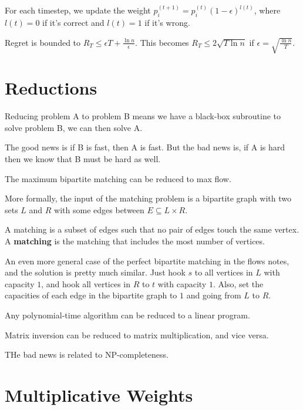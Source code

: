 \documentclass{article}
\begin{document}
For each timestep, we update the weight $p_i^{(t + 1)} = p_i^{(t)}(1 - \epsilon)^{l(t)}$, where $l(t) = 0$ if it's correct and $l(t) = 1$ if it's wrong.

Regret is bounded to $R_T \leq \epsilon T + \frac{\ln n}{\epsilon}$. This becomes $R_T \leq 2 \sqrt{T \ln n}$ if $\epsilon = \sqrt{\frac{\ln n}{T}}$.

\section{Reductions}
Reducing problem A to problem B means we have a black-box subroutine to solve problem B, we can then solve A.

The good news is if B is fast, then A is fast. But the bad news is, if A is hard then we know that B must be hard as well.

\begin{ex}
    The maximum bipartite matching can be reduced to max flow. 
    
    More formally, the input of the matching problem is a bipartite graph with two sets $L$ and $R$ with some edges between $E \subseteq L \times R$. 

    A matching is a subset of edges such that no pair of edges touch the same vertex. A \textbf{matching} is the matching that includes the most number of vertices.
\end{ex}

An even more general case of the perfect bipartite matching in the flows notes, and the solution is pretty much similar. Just hook $s$ to all vertices in $L$ with capacity $1$, and hook all vertices in $R$ to $t$ with capacity $1$. Also, set the capacities of each edge in the bipartite graph to $1$ and going from $L$ to $R$.

\begin{ex}
    Any polynomial-time algorithm can be reduced to a linear program. 
\end{ex}

\begin{ex}
    Matrix inversion can be reduced to matrix multiplication, and vice versa.
\end{ex}

THe bad news is related to NP-completeness.

\section{Multiplicative Weights}
\end{document}
